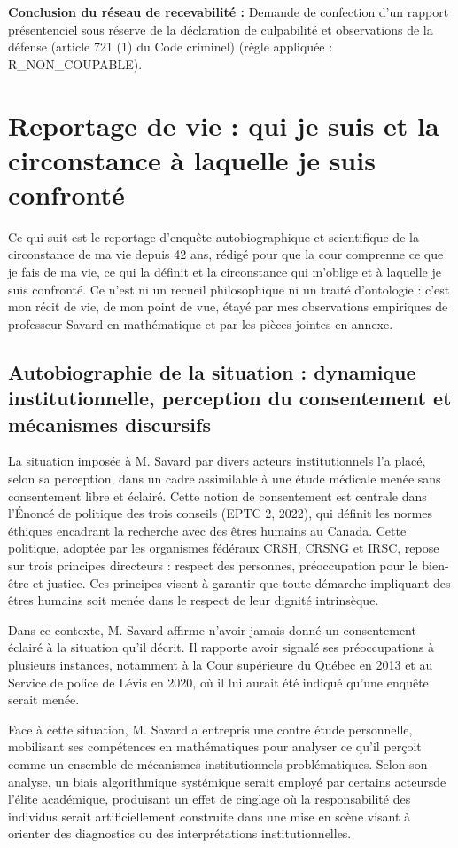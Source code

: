 \documentclass[12pt,a4paper]{article}
\begin{document}
\textbf{Conclusion du réseau de recevabilité :} Demande de confection d'un rapport présentenciel sous réserve de la déclaration de culpabilité et observations de la défense (article 721 (1) du Code criminel) (règle appliquée : R\_NON\_COUPABLE).

\section{Reportage de vie : qui je suis et la circonstance à laquelle je suis confronté}
Ce qui suit est le reportage d'enquête autobiographique et scientifique de la circonstance de ma vie depuis 42 ans, rédigé pour que la cour comprenne ce que je fais de ma vie, ce qui la définit et la circonstance qui m'oblige et à laquelle je suis confronté. Ce n'est ni un recueil philosophique ni un traité d'ontologie : c'est mon récit de vie, de mon point de vue, étayé par mes observations empiriques de professeur Savard en mathématique et par les pièces jointes en annexe.

\subsection*{Autobiographie de la situation : dynamique institutionnelle, perception du consentement et mécanismes discursifs}
La situation imposée à M. Savard par divers acteurs institutionnels l’a placé, selon sa perception, dans un cadre assimilable à une étude médicale menée sans consentement libre et éclairé. Cette notion de consentement est centrale dans l’Énoncé de politique des trois conseils (EPTC 2, 2022), qui définit les normes éthiques encadrant la recherche avec des êtres humains au Canada. Cette politique, adoptée par les organismes fédéraux CRSH, CRSNG et IRSC, repose sur trois principes directeurs : respect des personnes, préoccupation pour le bien-être et justice. Ces principes visent à garantir que toute démarche impliquant des êtres humains soit menée dans le respect de leur dignité intrinsèque.

Dans ce contexte, M. Savard affirme n’avoir jamais donné un consentement éclairé à la situation qu’il décrit. Il rapporte avoir signalé ses préoccupations à plusieurs instances, notamment à la Cour supérieure du Québec en 2013 et au Service de police de Lévis en 2020, où il lui aurait été indiqué qu’une enquête serait menée.

Face à cette situation, M. Savard a entrepris une contre étude personnelle, mobilisant ses compétences en mathématiques pour analyser ce qu’il perçoit comme un ensemble de mécanismes institutionnels problématiques. Selon son analyse, un biais algorithmique systémique serait employé par certains acteursde l’élite académique, produisant un effet de cinglage où la responsabilité des individus serait artificiellement construite dans une mise en scène visant à orienter des diagnostics ou des interprétations institutionnelles.
\end{document}
